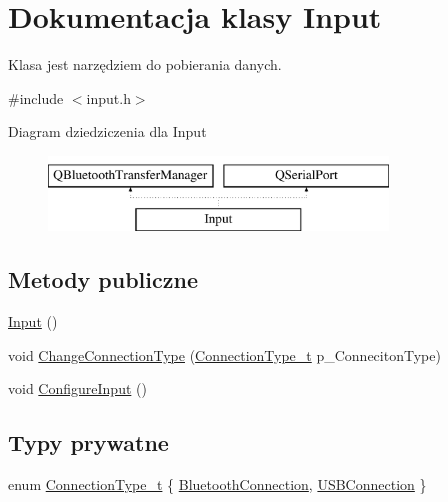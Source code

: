 \hypertarget{class_input}{}\section{Dokumentacja klasy Input}
\label{class_input}


Klasa jest narzędziem do pobierania danych.  




{\ttfamily \#include $<$input.\+h$>$}

Diagram dziedziczenia dla Input\begin{figure}[H]
\begin{center}
\leavevmode
\includegraphics[height=2.000000cm]{class_input}
\end{center}
\end{figure}
\subsection*{Metody publiczne}
\begin{DoxyCompactItemize}
\item 
\hyperlink{class_input_abae3f379d3f157cf42dc857309832dba}{Input} ()
\item 
void \hyperlink{class_input_a76cacaeadb1ceed7f3f9585220e906c8}{Change\+Connection\+Type} (\hyperlink{class_input_a3be20be9b454515798ecd3370f4e36fd}{Connection\+Type\+\_\+t} p\+\_\+\+Conneciton\+Type)
\item 
void \hyperlink{class_input_a7f95fd4a76826d4a28b25e32e6c7244c}{Configure\+Input} ()
\end{DoxyCompactItemize}
\subsection*{Typy prywatne}
\begin{DoxyCompactItemize}
\item 
enum \hyperlink{class_input_a3be20be9b454515798ecd3370f4e36fd}{Connection\+Type\+\_\+t} \{ \hyperlink{class_input_a3be20be9b454515798ecd3370f4e36fda6046a4f4c91eb7a02b26c594c36b9374}{Bluetooth\+Connection}, 
\hyperlink{class_input_a3be20be9b454515798ecd3370f4e36fdaf2a909e54a7c789666bc3bebb2a67370}{U\+S\+B\+Connection}
 \}
\end{DoxyCompactItemize}
